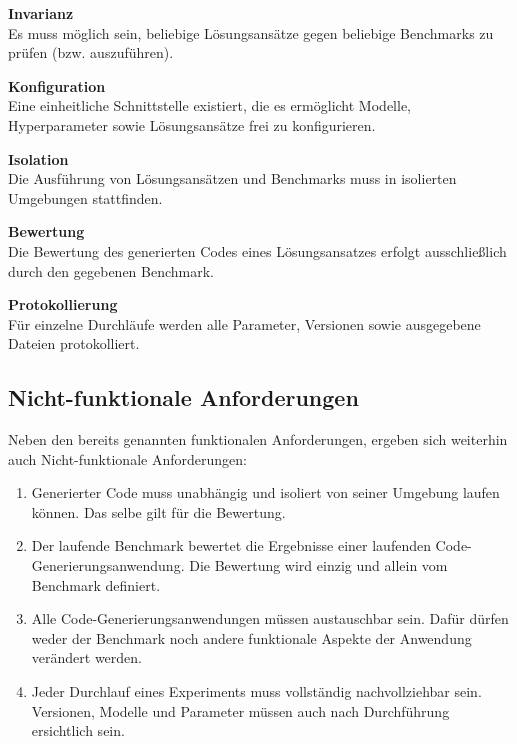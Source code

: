 \textbf{Invarianz}\label{req:FA1} \\ Es muss möglich sein, beliebige Lösungsansätze gegen beliebige Benchmarks zu prüfen (bzw. auszuführen).

\textbf{Konfiguration}\label{req:FA2} \\ Eine einheitliche Schnittstelle existiert, die es ermöglicht Modelle, Hyperparameter sowie Lösungsansätze frei zu konfigurieren.

\textbf{Isolation}\label{req:FA3} \\ Die Ausführung von Lösungsansätzen und Benchmarks muss in isolierten Umgebungen stattfinden.

\textbf{Bewertung}\label{req:FA4} \\ Die Bewertung des generierten Codes eines Lösungsansatzes erfolgt ausschließlich durch den gegebenen Benchmark.

\textbf{Protokollierung}\label{req:FA5} \\ Für einzelne Durchläufe werden alle Parameter, Versionen sowie ausgegebene Dateien protokolliert. 



\subsection{Nicht-funktionale Anforderungen}\label{ch:Nich-Funktionale Anforderungen}

Neben den bereits genannten funktionalen Anforderungen, ergeben sich weiterhin auch Nicht-funktionale Anforderungen:

\begin{enumerate}
    \item Generierter Code muss unabhängig und isoliert von seiner Umgebung laufen können. Das selbe gilt für die Bewertung.
    \item Der laufende Benchmark bewertet die Ergebnisse einer laufenden Code-Generierungsanwendung. Die Bewertung wird einzig und allein vom Benchmark definiert.
    \item Alle Code-Generierungsanwendungen müssen austauschbar sein. Dafür dürfen weder der Benchmark noch andere funktionale Aspekte der Anwendung verändert werden.
    \item Jeder Durchlauf eines Experiments muss vollständig nachvollziehbar sein. Versionen, Modelle und Parameter müssen auch nach Durchführung ersichtlich sein.
\end{enumerate}

